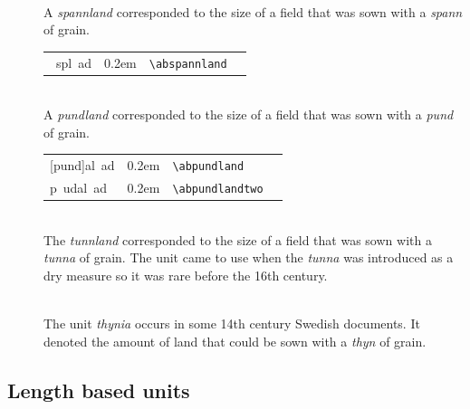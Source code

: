 \documentclass[a4paper]{article}
\newcommand{\samplefont}{\fontsize{16}{16}\abcursivefamily\spaceskip0.2em}
\newcommand{\sample}[1]{{\samplefont #1 \strut}}
\newcommand{\ltxncmd}[1]{\texttt{\textbackslash{}#1}}
\begin{document}
\begin{description}
\item [\sample{\abspannland} \emph{spannland},
  \emph{panninala}] \mbox{} \\
  A \emph{spannland} corresponded to the size of a field that was sown
  with a \emph{spann} of grain.
  \begin{center}
    \begin{tabular}{llll}
      {}~spl~ad & \sample{\abspannland} & \ltxncmd{abspannland} \\
    \end{tabular}
  \end{center}

\item [\sample{\abpundland} \emph{pundland},
  \emph{punnanala}] \mbox {} \\
  A \emph{pundland} corresponded to the size of a field that was sown
  with a \emph{pund} of grain.
  \begin{center}
    \begin{tabular}{llll}
      {}[pund]al~ad & \sample{\abpundland} & \ltxncmd{abpundland} \\
      {}p~udal~ad & \sample{\abpundlandtwo} & \ltxncmd{abpundlandtwo} \\
    \end{tabular}
  \end{center}

\item [\sample{\abtunnland} \emph{tunnland},
  \emph{tynnyrinala} ] \mbox{} \\
  The \emph{tunnland} corresponded to the size of a field that was
  sown with a \emph{tunna} of grain. The unit came to use when the
  \emph{tunna} was introduced as a dry measure so it was rare before
  the 16th century. 


\item [\sample{thynia}, \emph{thynia}] \mbox{} \\
  The unit \emph{thynia} occurs in some 14th century Swedish
  documents. It denoted the amount of land that could be sown with a
  \emph{thyn} of grain.

\end{description}


\subsection{Length based units} 
\end{document}
